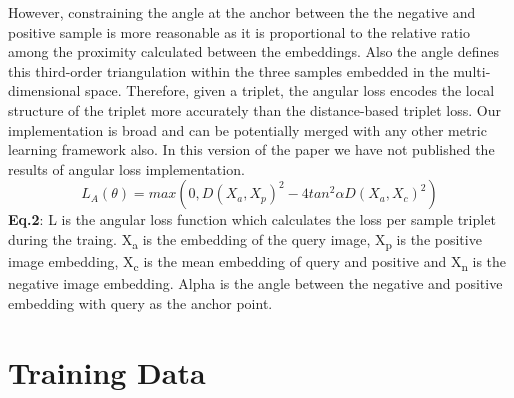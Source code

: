 \documentclass[10pt,twocolumn,letterpaper]{article}
\begin{document}
However, constraining the angle at the anchor between the the negative and positive sample is more reasonable as it is proportional to the relative ratio among the proximity calculated between the embeddings. Also the angle defines this third-order triangulation within the three samples embedded in the multi-dimensional space. Therefore, given a triplet, the angular loss encodes the local structure of the triplet more accurately than the distance-based triplet loss. Our implementation is broad and can be potentially merged with any other metric learning framework also.  In this version of the paper we have not published the results of angular loss implementation.
\begin{equation}
 L_{A}(\theta) = max(0, D(X_a,X_p)^2 - 4 tan^2 \alpha D(X_a,X_c)^2)
\end{equation}
\textbf{Eq.2}:  L is the angular loss function which calculates the loss per sample triplet during the traing. X\textsubscript{a} is the embedding of the query image, X\textsubscript{p} is the positive image embedding, X\textsubscript{c} is the mean embedding of query and positive and X\textsubscript{n} is the negative image embedding. Alpha is the angle between the negative and positive embedding with query as the anchor point.\\

\vspace{-2mm}
\section{Training Data}\vspace{-1mm}
\end{document}
